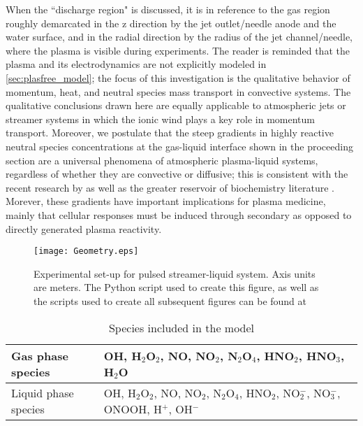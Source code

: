 When the ``discharge region" is discussed, it is in reference to the gas region roughly demarcated in the z direction by the jet outlet/needle anode and the water surface, and in the radial direction by the radius of the jet channel/needle, where the plasma is visible during experiments. The reader is reminded that the plasma and its electrodynamics are not explicitly modeled in \cref{sec:plasfree_model}; the focus of this investigation is the qualitative behavior of momentum, heat, and neutral species mass transport in convective systems. The qualitative conclusions drawn here are equally applicable to atmospheric jets or streamer systems in which the ionic wind plays a key role in momentum transport. Moreover, we postulate that the steep gradients in highly reactive neutral species concentrations at the gas-liquid interface shown in the proceeding section are a universal phenomena of atmospheric plasma-liquid systems, regardless of whether they are convective or diffusive; this is consistent with the recent research by \cite{Chen2014a} as well as the greater reservoir of biochemistry literature \cite{Halliwell}. Morever, these gradients have important implications for plasma medicine, mainly that cellular responses must be induced through secondary as opposed to directly generated plasma reactivity.

\begin{figure}[htb]
    \centering
        \texttt{[image: Geometry.eps]}
    \caption{Experimental set-up for pulsed streamer-liquid system. Axis units are meters. The Python script used to create this figure, as well as the scripts used to create all subsequent figures can be found at \cite{scriptsLocation}}
    \label{fig:model_geom}
\end{figure}

\begin{table}[htpb]
    \begin{center}
        \begin{tabular}{|l| p{10cm}|}
            \hline
            Gas phase species & OH, H$_2$O$_2$, NO, NO$_2$, N$_2$O$_4$, HNO$_2$, HNO$_3$, H$_2$O \\
            \hline
            Liquid phase species & OH, H$_2$O$_2$, NO, NO$_2$, N$_2$O$_4$, HNO$_2$, NO$_2^-$, NO$_3^-$, ONOOH, H$^+$, OH$^-$ \\
            \hline
        \end{tabular}
    \end{center}
    \caption{Species included in the model}
    \label{tab:species_list}
\end{table}


